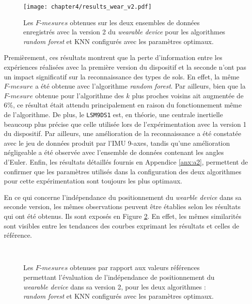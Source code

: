 \begin{figure}[H]
	\centering
	\texttt{[image: chapter4/results\_wear\_v2.pdf]}
        \caption{Les $F\mbox{-} mesures$ obtenues sur les deux ensembles de données enregistrés avec la version 2 du \textit{wearable device} pour les algorithmes \textit{random forest} et \acs{KNN} configurés avec les paramètres optimaux.}
	\label{fig:results_wear_v2}
\end{figure}

Premièrement, ces résultats montrent que la perte d'information entre les expériences réalisées avec la première version du dispositif et la seconde n'ont pas un impact significatif sur la reconnaissance des types de sols. En effet, la même $F\mbox{-}mesure$ a été obtenue avec l'algorithme \textit{random forest}. Par ailleurs, bien que la $F\mbox{-}mesure$ obtenue pour l'algorithme des $k$ plus proches voisins ait augmentée de 6\%, ce résultat était attendu principalement en raison du fonctionnement même de l'algorithme. De plus, le \texttt{LSM9DS1} est, en théorie, une centrale inertielle beaucoup plus précise que celle utilisée lors de l'expérimentation avec la version 1 du dispositif. Par ailleurs, une amélioration de la reconnaissance a été constatée avec le jeu de données produit par l'\acs{IMU} 9-axes, tandis qu'une amélioration négligeable a été observée avec l'ensemble de données contenant les angles d'Euler. Enfin, les résultats détaillés fournis en Appendice \ref{anx:a2}, permettent de confirmer que les paramètres utilisés dans la configuration des deux algorithmes pour cette expérimentation sont toujours les plus optimaux.

En ce qui concerne l'indépendance du positionnement du \textit{wearble device} dans sa seconde version, les mêmes observations peuvent être établies selon les résultats qui ont été obtenus. Ils sont exposés en Figure \ref{fig:pos_ind_wear_v2}. En effet, les mêmes similarités sont visibles entre les tendances des courbes exprimant les résultats et celles de référence.

\begin{figure}[H]
    \centering
    \\[20pt]
    \caption{Les $F\mbox{-} mesures$ obtenues par rapport aux valeurs références permettant l'évaluation de l'indépendance de positionnement du \textit{wearable device} dans sa version 2, pour les deux algorithmes : \textit{random forest} et \acs{KNN} configurés avec les paramètres optimaux.}
    \label{fig:pos_ind_wear_v2}
\end{figure}

